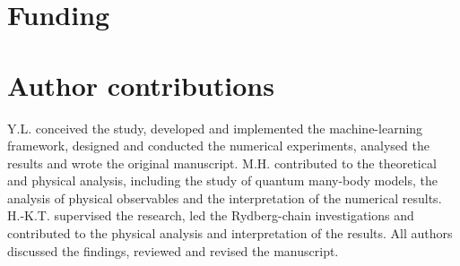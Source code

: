 \documentclass[pdflatex,sn-nature]{sn-jnl}%
\theoremstyle{thmstyleone}%
\theoremstyle{thmstyletwo}%
\theoremstyle{thmstylethree}%
\begin{document}









\section*{Funding}

\section*{Author contributions}
Y.L. conceived the study, developed and implemented the machine-learning framework, designed and conducted the numerical experiments, analysed the results and wrote the original manuscript. M.H. contributed to the theoretical and physical analysis, including the study of quantum many-body models, the analysis of physical observables and the interpretation of the numerical results. H.-K.T. supervised the research, led the Rydberg-chain investigations and contributed to the physical analysis and interpretation of the results. All authors discussed the findings, reviewed and revised the manuscript.
\end{document}
